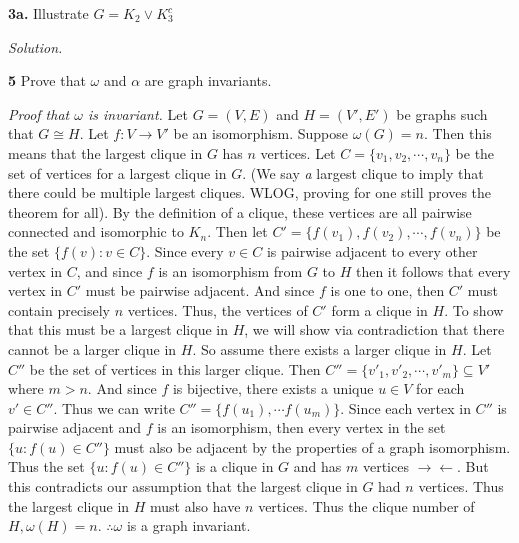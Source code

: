 \documentclass{article}
\begin{document}
\textbf{3a.} Illustrate \(G= K_2 \vee K^c_3\)


\vspace{2mm}

\textit{Solution.}


\begin{center}
\end{center}

\vspace{4mm}

\textbf{5} Prove that \(\omega\) and \(\alpha\) are graph invariants. 


\vspace{2mm}

\textit{Proof that \(\omega\) is invariant.} Let \(G= (V,E)\) and \(H=(V',E')\) be graphs such that \(G \cong H\). Let \(f:V\rightarrow V'\) be an isomorphism. Suppose \(\omega(G) = n\). Then this means that the largest clique in \(G\) has \(n\) vertices. Let \(C=\{v_1, v_2,\cdots, v_n\}\) be the set of vertices for a largest clique in \(G\). (We say \textit{a} largest clique to imply that there could be multiple largest cliques. WLOG, proving for one still proves the theorem for all). By the definition of a clique, these vertices are all pairwise connected and isomorphic to \(K_n\). Then let \(C'=\{f(v_1), f(v_2), \cdots, f(v_n)\}  \) be the set \(\{f(v) : v\in C\}\). Since every \(v\in C\) is pairwise adjacent to every other vertex in \(C\), and since \(f\) is an isomorphism from \(G\) to \(H\) then it follows that every vertex in \(C'\) must be pairwise adjacent. And since \(f\) is one to one, then \(C'\) must contain precisely \(n\) vertices. Thus, the vertices of \(C'\) form a clique in \(H\). To show that this must be a largest clique in \(H\), we will show via contradiction that there cannot be a larger clique in \(H\). So assume there exists a larger clique in \(H\). Let \(C''\) be the set of vertices in this larger clique. Then \( C'' =\{v'_1,v'_2, \cdots,v'_m\} \subseteq V' \) where \( m>n\). And since \(f\) is bijective, there exists a unique \(u \in V\) for each \(v' \in C''\). Thus we can write \(C''=\{f(u_1), \cdots f(u_m)\} \). Since each vertex in \(C'' \) is pairwise adjacent and  \(f\) is an isomorphism, then every vertex in the set \( \{ u : f(u) \in C''\}\) must also be adjacent by the properties of a graph isomorphism. Thus the set \( \{ u : f(u) \in C''\}\) is a clique in \(G\) and has \(m\) vertices \( \rightarrow\!\leftarrow \). But this contradicts our assumption that the largest clique in \(G\) had \(n\) vertices. Thus the largest clique in \(H\) must also have \(n \) vertices. Thus the clique number of \(H, \omega(H)=n\). \(\therefore \omega\) is a graph invariant. 
\end{document}
